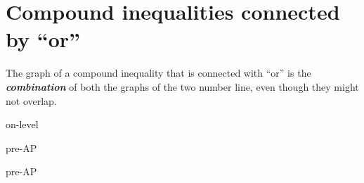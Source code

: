 \section*{Compound inequalities connected by ``or''}

\begin{center}
    \begin{tcolorbox}[width=4in]
        The graph of a compound inequality that is connected with ``or''
        is the {\bfseries\itshape combination} of both the graphs of the two number line,
        even though they might not overlap.
    \end{tcolorbox}
\end{center}



\begin{taggedblock}{on-level}
\end{taggedblock}
\begin{taggedblock}{pre-AP}
\end{taggedblock}


\begin{taggedblock}{pre-AP}
\end{taggedblock}
